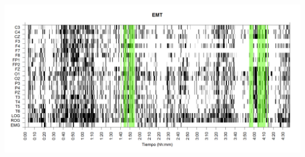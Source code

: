 
\begin{SidewaysFigure}
\centering
\includegraphics[width=\linewidth]
{./grafiquitos170404/EMNNS_est.png} 
\caption{Sujeto: EMT | Total \'epocas: 555 | \'Epocas MOR: 47
}
\label{EMT}
\end{SidewaysFigure}

%
%
%

